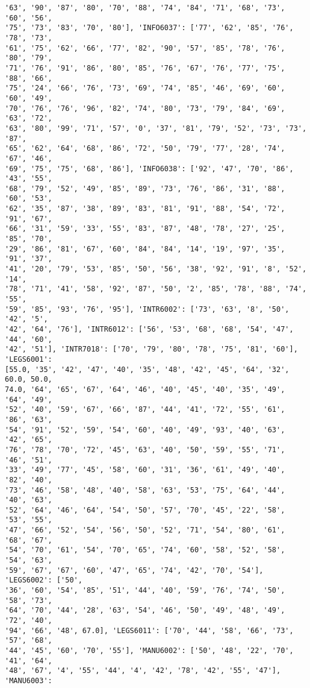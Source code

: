 \documentclass[11pt]{article}
\begin{document}
\begin{Verbatim}[commandchars=\\\{\}]
'63', '90', '87', '80', '70', '88', '74', '84', '71', '68', '73', '60', '56',
'75', '73', '83', '70', '80'], 'INFO6037': ['77', '62', '85', '76', '78', '73',
'61', '75', '62', '66', '77', '82', '90', '57', '85', '78', '76', '80', '79',
'71', '76', '91', '86', '80', '85', '76', '67', '76', '77', '75', '88', '66',
'75', '24', '66', '76', '73', '69', '74', '85', '46', '69', '60', '60', '49',
'70', '76', '76', '96', '82', '74', '80', '73', '79', '84', '69', '63', '72',
'63', '80', '99', '71', '57', '0', '37', '81', '79', '52', '73', '73', '87',
'65', '62', '64', '68', '86', '72', '50', '79', '77', '28', '74', '67', '46',
'69', '75', '75', '68', '86'], 'INFO6038': ['92', '47', '70', '86', '43', '55',
'68', '79', '52', '49', '85', '89', '73', '76', '86', '31', '88', '60', '53',
'62', '35', '87', '38', '89', '83', '81', '91', '88', '54', '72', '91', '67',
'66', '31', '59', '33', '55', '83', '87', '48', '78', '27', '25', '85', '70',
'29', '86', '81', '67', '60', '84', '84', '14', '19', '97', '35', '91', '37',
'41', '20', '79', '53', '85', '50', '56', '38', '92', '91', '8', '52', '14',
'78', '71', '41', '58', '92', '87', '50', '2', '85', '78', '88', '74', '55',
'59', '85', '93', '76', '95'], 'INTR6002': ['73', '63', '8', '50', '42', '5',
'42', '64', '76'], 'INTR6012': ['56', '53', '68', '68', '54', '47', '44', '60',
'42', '51'], 'INTR7018': ['70', '79', '80', '78', '75', '81', '60'], 'LEGS6001':
[55.0, '35', '42', '47', '40', '35', '48', '42', '45', '64', '32', 60.0, 50.0,
74.0, '64', '65', '67', '64', '46', '40', '45', '40', '35', '49', '64', '49',
'52', '40', '59', '67', '66', '87', '44', '41', '72', '55', '61', '86', '63',
'54', '91', '52', '59', '54', '60', '40', '49', '93', '40', '63', '42', '65',
'76', '78', '70', '72', '45', '63', '40', '50', '59', '55', '71', '46', '51',
'33', '49', '77', '45', '58', '60', '31', '36', '61', '49', '40', '82', '40',
'73', '46', '58', '48', '40', '58', '63', '53', '75', '64', '44', '40', '63',
'52', '64', '46', '64', '54', '50', '57', '70', '45', '22', '58', '53', '55',
'47', '66', '52', '54', '56', '50', '52', '71', '54', '80', '61', '68', '67',
'54', '70', '61', '54', '70', '65', '74', '60', '58', '52', '58', '54', '63',
'59', '67', '67', '60', '47', '65', '74', '42', '70', '54'], 'LEGS6002': ['50',
'36', '60', '54', '85', '51', '44', '40', '59', '76', '74', '50', '58', '73',
'64', '70', '44', '28', '63', '54', '46', '50', '49', '48', '49', '72', '40',
'94', '66', '48', 67.0], 'LEGS6011': ['70', '44', '58', '66', '73', '57', '68',
'44', '45', '60', '70', '55'], 'MANU6002': ['50', '48', '22', '70', '41', '64',
'48', '67', '4', '55', '44', '4', '42', '78', '42', '55', '47'], 'MANU6003':

\end{Verbatim}
\end{document}
